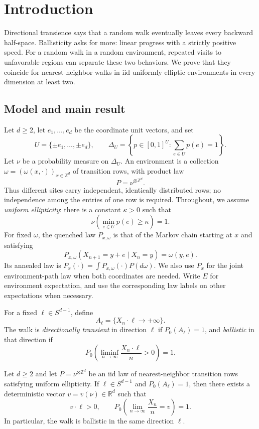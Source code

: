 \section{Introduction}\label{sec:introduction}

Directional transience says that a random walk eventually leaves every
backward half-space. Ballisticity asks for more: linear progress with a
strictly positive speed. For a random walk in a random environment,
repeated visits to unfavorable regions can separate these two behaviors.
We prove that they coincide for nearest-neighbor walks in iid uniformly
elliptic environments in every dimension at least two.

\subsection{Model and main result}

Let $d\ge2$, let $e_1,\ldots,e_d$ be the coordinate unit vectors, and set
\[
 U=\{\pm e_1,\ldots,\pm e_d\},\qquad
 \Delta_U=\left\{p\in[0,1]^U:\sum_{e\in U}p(e)=1\right\}.
\]
Let $\nu$ be a probability measure on $\Delta_U$. An environment is a
collection $\omega=(\omega(x,\cdot))_{x\in\mathbb Z^d}$ of transition
rows, with product law
\[
 P=\nu^{\otimes\mathbb Z^d}.
\]
Thus different sites carry independent, identically distributed rows;
no independence among the entries of one row is required. Throughout,
we assume \emph{uniform ellipticity}: there is a constant $\kappa>0$ such
that
\[
 \nu\!\left(\min_{e\in U}p(e)\ge\kappa\right)=1.
\]
For fixed $\omega$, the quenched law $P_{x,\omega}$ is that of the Markov
chain starting at $x$ and satisfying
\[
 P_{x,\omega}(X_{n+1}=y+e\mid X_n=y)=\omega(y,e).
\]
Its annealed law is $P_x(\cdot)=\int P_{x,\omega}(\cdot)P(d\omega)$.
We also use $P_x$ for the joint environment-path law when both coordinates
are needed. Write $E$ for environment expectation, and use the corresponding
law labels on other expectations when necessary.

For a fixed $\ell\in S^{d-1}$, define
\[
 A_\ell=\{X_n\cdot\ell\longrightarrow+\infty\}.
\]
The walk is \emph{directionally transient} in direction $\ell$ if
$P_0(A_\ell)=1$, and \emph{ballistic} in that direction if
\[
 P_0\!\left(\liminf_{n\to\infty}\frac{X_n\cdot\ell}{n}>0\right)=1.
\]

\begin{theorem}\label{thm:main}
Let $d\ge2$ and let $P=\nu^{\otimes\mathbb Z^d}$ be an iid law of
nearest-neighbor transition rows satisfying uniform ellipticity. If
$\ell\in S^{d-1}$ and $P_0(A_\ell)=1$, then there exists a deterministic
vector $v=v(\nu)\in\mathbb R^d$ such that
\[
 v\cdot\ell>0,
 \qquad
 P_0\!\left(\lim_{n\to\infty}\frac{X_n}{n}=v\right)=1.
\]
In particular, the walk is ballistic in the same direction $\ell$.
\end{theorem}

